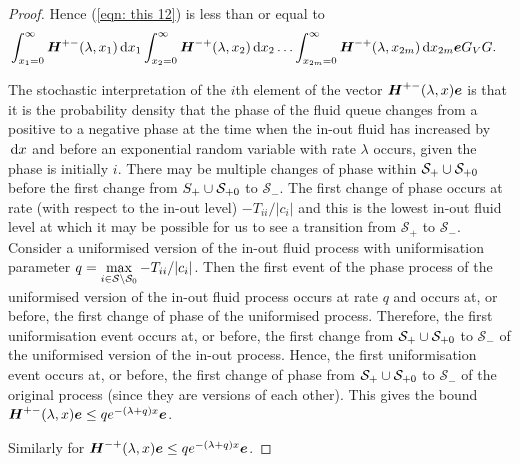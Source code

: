 \begin{proof}
	Hence (\ref{eqn: this 12}) is less than or equal to 
	\begin{align}
		& \int_{x_1=0}^\infty \boldsymbol H^{+-}(\lambda,x_1) \, \mathrm{d} x_1 \int_{x_2=0}^\infty \boldsymbol H^{-+}(\lambda,x_2)  \, \mathrm{d} x_2  
                	\hdots \int_{x_{2m}=0}^\infty \boldsymbol H^{-+}(\lambda, x_{2m})\, \mathrm{d} x_{2m}\boldsymbol e G_VG. \label{eqn: this 123}
        \end{align}
	        
        The stochastic interpretation of the \(i\)th element of the vector \(\boldsymbol H^{+-}(\lambda,x)\boldsymbol e\) is that it is the probability density that the phase of the fluid queue changes from a positive to a negative phase at the time when the in-out fluid has increased by \(\, \mathrm{d} x\) and before an exponential random variable with rate \(\lambda\) occurs, given the phase is initially \(i\). There may be multiple changes of phase within \(\mathcal S_+\cup\mathcal{S}_{+0}\) before the first change from \(\mathcal \mathcal S_+\cup\mathcal{S}_{+0}\) to \(\mathcal S_-\). The first change of phase occurs at rate (with respect to the in-out level) \(-T_{ii}/|c_i|\) and this is the lowest in-out fluid level at which it may be possible for us to see a transition from \(\mathcal S_+\) to \(\mathcal S_-\). Consider a uniformised version of the in-out fluid process with uniformisation parameter \(q = \max\limits_{i\in\mathcal S\setminus \mathcal{S}_0}-T_{ii}/|c_i|\). Then the first event of the phase process of the uniformised version of the in-out fluid process occurs at rate \(q\) and occurs at, or before, the first change of phase of the uniformised process. Therefore, the first uniformisation event occurs at, or before, the first change from \(\mathcal S_+\cup\mathcal{S}_{+0}\) to \(\mathcal S_-\) of the uniformised version of the in-out process. Hence, the first uniformisation event occurs at, or before, the first change of phase from \(\mathcal S_+\cup\mathcal{S}_{+0}\) to \(\mathcal S_-\) of the original process (since they are versions of each other). This gives the bound \(\boldsymbol H^{+-}(\lambda,x)\boldsymbol e\leq qe^{-(\lambda + q)x}\boldsymbol e\).
        
        Similarly for \(\boldsymbol H^{-+}(\lambda,x)\boldsymbol e\leq qe^{-(\lambda + q)x}\boldsymbol e\).
        

\end{proof}
